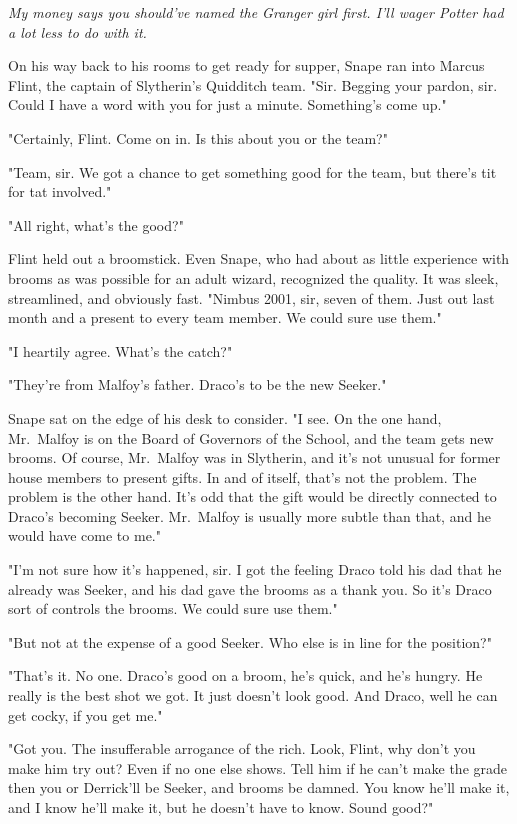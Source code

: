 \emph{My money says you should've named the Granger girl first. I'll wager Potter had a lot less to do with it.}

On his way back to his rooms to get ready for supper, Snape ran into Marcus Flint, the captain of Slytherin's Quidditch team. "Sir. Begging your pardon, sir. Could I have a word with you for just a minute. Something's come up."

"Certainly, Flint. Come on in. Is this about you or the team?"

"Team, sir. We got a chance to get something good for the team, but there's tit for tat involved."

"All right, what's the good?"

Flint held out a broomstick. Even Snape, who had about as little experience with brooms as was possible for an adult wizard, recognized the quality. It was sleek, streamlined, and obviously fast. "Nimbus 2001, sir, seven of them. Just out last month and a present to every team member. We could sure use them."

"I heartily agree. What's the catch?"

"They're from Malfoy's father. Draco's to be the new Seeker."

Snape sat on the edge of his desk to consider. "I see. On the one hand, Mr.~Malfoy is on the Board of Governors of the School, and the team gets new brooms. Of course, Mr.~Malfoy was in Slytherin, and it's not unusual for former house members to present gifts. In and of itself, that's not the problem. The problem is the other hand. It's odd that the gift would be directly connected to Draco's becoming Seeker. Mr.~Malfoy is usually more subtle than that, and he would have come to me."

"I'm not sure how it's happened, sir. I got the feeling Draco told his dad that he already was Seeker, and his dad gave the brooms as a thank you. So it's Draco sort of controls the brooms. We could sure use them."

"But not at the expense of a good Seeker. Who else is in line for the position?"

"That's it. No one. Draco's good on a broom, he's quick, and he's hungry. He really is the best shot we got. It just doesn't look good. And Draco, well he can get cocky, if you get me."

"Got you. The insufferable arrogance of the rich. Look, Flint, why don't you make him try out? Even if no one else shows. Tell him if he can't make the grade then you or Derrick'll be Seeker, and brooms be damned. You know he'll make it, and I know he'll make it, but he doesn't have to know. Sound good?"

